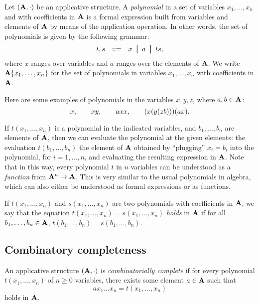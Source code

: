 \documentclass{article}
\begin{document}
\begin{definition}
  Let $({\bf A},\cdot)$ be an applicative structure. A {\em polynomial} in
  a set of variables $x_1,\ldots,x_n$ and with coefficients in ${\bf A}$
  is a formal expression built from variables and elements of ${\bf A}$ by
  means of the application operation. In other words, the set of
  polynomials is given by the following grammar:
  \[ \begin{array}{lll}
    t,s&\bnf& x\bor a\bor ts,
  \end{array}
  \]
  where $x$ ranges over variables and $a$ ranges over the elements of
  ${\bf A}$. We write ${\bf A}\{x_1,\ldots,x_n\}$ for the set of polynomials
  in variables $x_1,\ldots,x_n$ with coefficients in ${\bf A}$.
\end{definition}

Here are some examples of polynomials in the variables $x,y,z$,
where $a,b\in{\bf A}$:
\[ x,\hspace{2em} xy, \hspace{2em} axx, \hspace{2em} (x(y(zb)))(ax).
\]

If $t(x_1,\ldots,x_n)$ is a polynomial in the indicated variables,
and $b_1,\ldots,b_n$ are elements of ${\bf A}$, then we can evaluate the
polynomial at the given elements: the evaluation $t(b_1,\ldots,b_n)$
the element of ${\bf A}$ obtained by ``plugging'' $x_i=b_i$ into the
polynomial, for $i=1,\ldots,n$, and evaluating the resulting
expression in ${\bf A}$. Note that in this way, every polynomial $t$ in
$n$ variables can be understood as a {\em function} from ${\bf A}^n\to
{\bf A}$. This is very similar to the usual polynomials in algebra, which
can also either be understood as formal expressions or as functions.

If $t(x_1,\ldots,x_n)$ and $s(x_1,\ldots,x_n)$ are two polynomials
with coefficients in ${\bf A}$, we say that the equation
$t(x_1,\ldots,x_n) = s(x_1,\ldots,x_n)$ {\em holds} in ${\bf A}$ if for
all $b_1,\ldots,b_n\in{\bf A}$, $t(b_1,\ldots,b_n) = s(b_1,\ldots,b_n)$.

\subsection{Combinatory completeness}

\begin{definition}
  An applicative structure $({\bf A},\cdot)$ is {\em combinatorially
    complete} if for every polynomial $t(x_1,\ldots,x_n)$ of $n\geq 0$
  variables, there exists some element $a\in{\bf A}$ such that
  \[ ax_1\ldots x_n = t(x_1,\ldots,x_n)
  \]
  holds in ${\bf A}$.
\end{definition}
\end{document}
